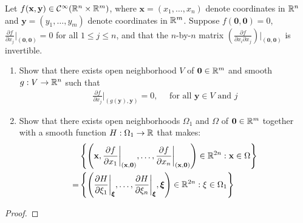 \documentclass{report}
\begin{document}
\begin{question}{}{}
Let $f(\textbf{x},\textbf{y})\in \mathcal{C}^{\infty} (\mathbb{R}^n \times \mathbb{R}^m)$, where $\textbf{x}=(x_1,\dots ,x_n)$ denote coordinates in $\mathbb{R}^n$ and  $\textbf{y}= (y_1,\dots ,y_m)$ denote coordinates in $\mathbb{R}^m$. Suppose $f(\textbf{0},\textbf{0})=0$, $\frac{\partial f}{\partial x_j}\big|_{(\textbf{0},\textbf{0})}=0$ for all $1\leq j\leq n$, and that the $n$-by-$n$ matrix  $\left(\frac{\partial f}{\partial x_i\partial x_j} \right)\big|_{(\textbf{0},\textbf{0})}$ is invertible. 
\begin{enumerate}[label=(\Roman*)]
  \item Show that there exists open neighborhood $V$ of  $\textbf{0}\in\mathbb{R}^m$ and smooth $g:V\rightarrow \mathbb{R}^n$ such that  
    \begin{align*}
    \frac{\partial f}{\partial x_j}\bigg    |_{\left(g(\textbf{y}),\textbf{y} \right)}=0,\quad \text{ for all }\textbf{y}\in V\text{ and }j
    \end{align*} 
    \item Show that there exists open neighborhoods $\Omega_1$ and $\Omega$ of $\textbf{0}\in\mathbb{R}^m$ together with a smooth function $H:\Omega_1 \rightarrow \mathbb{R}$ that makes: 
 \begin{align*}
 &\left\{ \left(\textbf{x}, \frac{\partial f}{\partial x_1} \bigg|_{(\textbf{x},\textbf{0})}, \dots ,\frac{\partial f}{\partial x_n} \bigg  |_{(\textbf{x},\textbf{0})}\right)\in\mathbb{R}^{2n}:\textbf{x} \in \Omega \right\} \\
   =& \left\{  \left( \frac{\partial H}{\partial \xi_1} \bigg |_{\boldsymbol{\xi}} , \dots ,\frac{\partial H}{\partial \xi_n} \bigg |_{\boldsymbol{\xi}},  \boldsymbol{\xi} \right) \in\mathbb{R}^{2n}:\xi \in \Omega_1 \right\}
 \end{align*}
\end{enumerate}
\end{question}
\begin{proof}

\end{proof}
\end{document}
